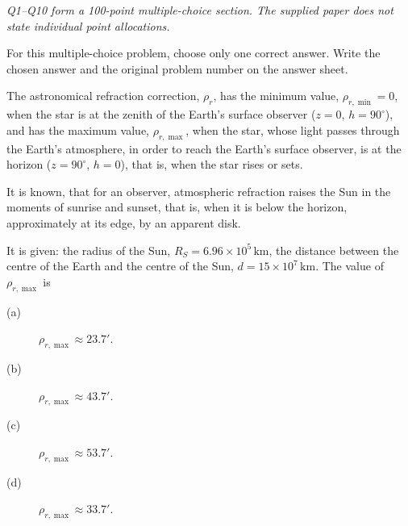 \textit{Q1--Q10 form a 100-point multiple-choice section. The supplied paper
does not state individual point allocations.}

For this multiple-choice problem, choose only one correct answer. Write the
chosen answer and the original problem number on the answer sheet.

The astronomical refraction correction, $\rho_r$, has the minimum value,
$\rho_{r,\min}=0$, when the star is at the zenith of the Earth's surface
observer ($z=0$, $h=90^\circ$), and has the maximum value, $\rho_{r,\max}$,
when the star, whose light passes through the Earth's atmosphere, in order
to reach the Earth's surface observer, is at the horizon
($z=90^\circ$, $h=0$), that is, when the star rises or sets.

It is known, that for an observer, atmospheric refraction raises the Sun in
the moments of sunrise and sunset, that is, when it is below the horizon,
approximately at its edge, by an apparent disk.

It is given: the radius of the Sun, $R_S=6.96\times10^5\,\mathrm{km}$, the
distance between the centre of the Earth and the centre of the Sun,
$d=15\times10^7\,\mathrm{km}$.
The value of $\rho_{r,\max}$ is
\begin{description}
\item[(a)] $\rho_{r,\max}\approx23.7'$.
\item[(b)] $\rho_{r,\max}\approx43.7'$.
\item[(c)] $\rho_{r,\max}\approx53.7'$.
\item[(d)] $\rho_{r,\max}\approx33.7'$.
\end{description}

